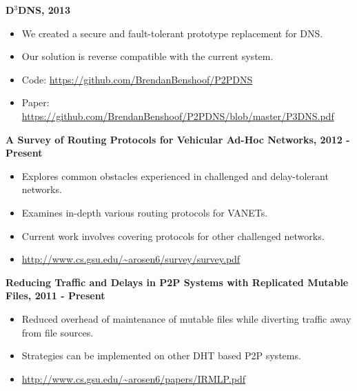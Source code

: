 \documentclass{res}
\begin{document}
\begin{resume}
{\bf D$^3$DNS, 2013 }
    \begin{itemize}
    \item We created a secure and fault-tolerant prototype replacement for DNS.
    \item Our solution is reverse compatible with the current system.
    \item Code: \url{https://github.com/BrendanBenshoof/P2PDNS}
    \item Paper: \url{https://github.com/BrendanBenshoof/P2PDNS/blob/master/P3DNS.pdf}
    \end{itemize}

 
%    


{\bf A Survey of Routing Protocols for Vehicular Ad-Hoc Networks, 2012 - Present}
    \begin{itemize}
    \item Explores common obstacles experienced in challenged and delay-tolerant networks.
    \item Examines in-depth various routing protocols for VANETs.
    \item Current work involves covering protocols for other challenged networks.
    \item \url{http://www.cs.gsu.edu/~arosen6/survey/survey.pdf}
    \end{itemize}

{\bf Reducing Traffic and Delays in P2P Systems with Replicated Mutable Files,  2011 - Present}
    \begin{itemize}
    \item Reduced overhead of maintenance of mutable files while diverting traffic away from file sources.
    \item Strategies can be implemented on other DHT based P2P systems.
    \item \url{http://www.cs.gsu.edu/~arosen6/papers/IRMLP.pdf}
    \end{itemize}



\end{resume}
\end{document}
